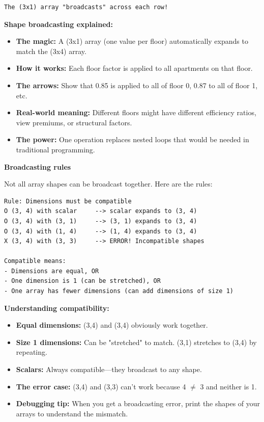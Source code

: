 \begin{tcolorbox}[
    title=Broadcasting visualized,
    colframe=purple,
    colback = white,
    arc=2mm,
    breakable
]
\begin{lstlisting}[basicstyle=\ttfamily\footnotesize,breaklines=true,columns=fullflexible,keepspaces=true,xleftmargin=0pt]
The (3x1) array "broadcasts" across each row!
\end{lstlisting}

\textbf{Shape broadcasting explained:}
\begin{itemize}
\item \textbf{The magic:} A (3x1) array (one value per floor) automatically expands to match the (3x4) array.
\item \textbf{How it works:} Each floor factor is applied to all apartments on that floor.
\item \textbf{The arrows:} Show that 0.85 is applied to all of floor 0, 0.87 to all of floor 1, etc.
\item \textbf{Real-world meaning:} Different floors might have different efficiency ratios, view premiums, or structural factors.
\item \textbf{The power:} One operation replaces nested loops that would be needed in traditional programming.
\end{itemize}
\vspace{2em}

\textbf{Broadcasting rules}

Not all array shapes can be broadcast together. Here are the rules:

\begin{lstlisting}[basicstyle=\ttfamily\footnotesize,breaklines=true,columns=fullflexible,keepspaces=true,xleftmargin=0pt]
Rule: Dimensions must be compatible
O (3, 4) with scalar     --> scalar expands to (3, 4)
O (3, 4) with (3, 1)     --> (3, 1) expands to (3, 4)
O (3, 4) with (1, 4)     --> (1, 4) expands to (3, 4)
X (3, 4) with (3, 3)     --> ERROR! Incompatible shapes

Compatible means:
- Dimensions are equal, OR
- One dimension is 1 (can be stretched), OR
- One array has fewer dimensions (can add dimensions of size 1)
\end{lstlisting}

\textbf{Understanding compatibility:}
\begin{itemize}
\item \textbf{Equal dimensions:} (3,4) and (3,4) obviously work together.
\item \textbf{Size 1 dimensions:} Can be "stretched" to match. (3,1) stretches to (3,4) by repeating.
\item \textbf{Scalars:} Always compatible---they broadcast to any shape.
\item \textbf{The error case:} (3,4) and (3,3) can't work because 4 $\neq$ 3 and neither is 1.
\item \textbf{Debugging tip:} When you get a broadcasting error, print the shapes of your arrays to understand the mismatch.
\end{itemize}
\end{tcolorbox}

